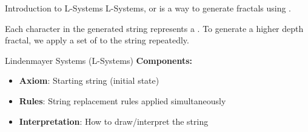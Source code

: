 \begin{frame}{Introduction to L-Systems}
  L-Systems, or  is a way to generate fractals using .

  Each character in the generated string represents a . To generate a higher depth fractal,
  we apply a set of  to the string repeatedly.

  \vspace{0.3cm}
  \begin{mathbox}{Lindenmayer Systems (L-Systems)}
    \textbf{Components:}
    \begin{itemize}
      \item \textbf{Axiom}: Starting string (initial state)
      \item \textbf{Rules}: String replacement rules applied simultaneously
      \item \textbf{Interpretation}: How to draw/interpret the string
    \end{itemize}
  \end{mathbox}
\end{frame}

